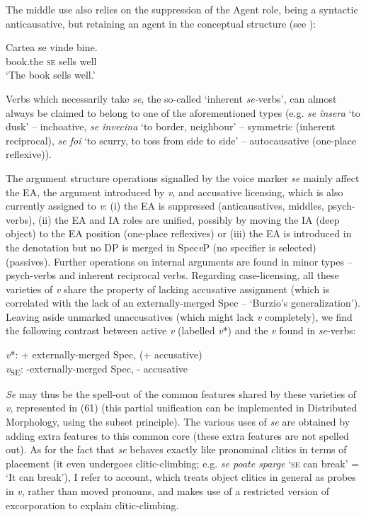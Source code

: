 \documentclass[output=paper]{langsci/langscibook}
\begin{document}
The middle use also relies on the suppression of the Agent role, being a syntactic anticausative, but retaining an agent in the conceptual structure (see \citealt{Schäfer2008}):

\ea%
    \label{ex:giurgea:60}
    \gll Cartea    se vinde bine. \\
         book.the \textsc{se} sells  well\\
    \glt ‘The book sells well.’
    \z

Verbs which necessarily take \textit{se}, the so-called ‘inherent \textit{se-}verbs', can almost always be claimed to belong to one of the aforementioned types (e.g. \textit{se însera} ‘to dusk’ – inchoative, \textit{se învecina} ‘to border, neighbour’ – symmetric (inherent reciprocal), \textit{se foi} ‘to scurry, to toss from side to side’ – autocausative (one-place reflexive)).

The argument structure operations signalled by the voice marker \textit{se} mainly affect the EA, the argument introduced by \textit{v}, and accusative licensing, which is also currently assigned to \textit{v}: (i) the EA is suppressed (anticausatives, middles, psych-verbs), (ii) the EA and IA roles are unified, possibly by moving the IA (deep object) to the EA position (one-place reflexives) or (iii) the EA is introduced in the denotation but no DP is merged in Spec\textit{v}P (no specifier is selected) (passives). Further operations on internal arguments are found in minor types – psych-verbs and inherent reciprocal verbs. Regarding case-licensing, all these varieties of \textit{v} share the property of lacking accusative assignment (which is correlated with the lack of an externally-merged Spec – ‘Burzio’s generalization'). Leaving aside unmarked unaccusatives (which might lack \textit{v} completely), we find the following contrast between active \textit{v} (labelled \textit{v}*) and the \textit{v} found in \textit{se}{}-verbs: 

\ea%
\label{ex:giurgea:61}
\label{bkm:Ref449274243}
\textit{v}*: + externally-merged Spec, (+ accusative)\\
\textit{v}\textsubscript{SE}: -externally-merged Spec, - accusative  
\z

\textit{Se} may thus be the spell-out of the common features shared by these varieties of \textit{v}, represented in (61) (this partial unification can be implemented in Distributed Morphology, using the subset principle). The various uses of \textit{se} are obtained by adding extra features to this common core (these extra features are not spelled out). As for the fact that \textit{se} behaves exactly like pronominal clitics in terms of placement (it even undergoes clitic-climbing; e.g. \textit{se poate sparge} ‘\textsc{se} can break’ = ‘It can break’), I refer to  account, which treats object clitics in general as probes in \textit{v}, rather than moved pronouns, and makes use of a restricted version of excorporation to explain clitic-climbing.
\end{document}
